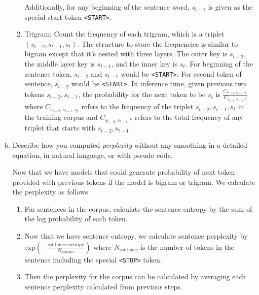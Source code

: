 \documentclass{article}
\newenvironment{solution}{\color{blue}}{}
\begin{document}
\begin{enumerate}[(a)]
\begin{solution}
\begin{enumerate}[1.]
      Additionally, for any beginning of the sentence word, $s_{t-1}$ is given as the special 
      start token \texttt{<START>}.
      \item Trigram: Count the frequency of each trigram, which is a triplet
      $(s_{t-2}, s_{t-1}, s_{t})$. The structure to store the frequencies is similar to 
      bigram except that it's nested with three layers. The outer key is $s_{t-2}$, the 
      middle layer key is $s_{t-1}$, and the inner key is $s_{t}$. For beginning of the 
      sentence token, $s_{t-2}$ and $s_{t-1}$ would be \texttt{<START>}. For second 
      token of sentence, $s_{t-2}$ would be \texttt{<START>}. In inference time, given 
      previous two tokens $s_{t-2}, s_{t-1}$, the probability for the next token to be 
      $s_{t}$ is $\frac{C_{s_{t-2}, s_{t-1}, s_{t}}}{C_{s_{t-2}, s_{t-1}, \ast}}$ where 
      $C_{s_{t-2}, s_{t-1}, s_{t}}$ refers to the frequency of the triplet $s_{t-2}, s_{t-1},
      s_{t}$ in the training corpus and $C_{s_{t-2}, s_{t-1}, \ast}$ refers to the total 
      frequency of any triplet that starts with $s_{t-2}, s_{t-1}$.
    \end{enumerate}
  \end{solution}
  
  \item Describe how you computed \textit{perplexity} without any smoothing in a detailed equation, in natural language, or with pseudo code.
  
  \begin{solution}
    Now that we have models that could generate probability of next token provided with previous 
    tokens if the model is bigram or trigram. We calculate the perplexity as follows
    \begin{enumerate}[1.]
      \item For sentences in the corpus, calculate the sentence entropy 
      by the sum of the log probability of each token.
      \item Now that we have sentence entropy, we calculate sentence perplexity by 
      $\text{exp}(-\frac{\text{sentence entropy}}{N_{\text{sentence}}})$ where 
      $N_{\text{sentence}}$ is the number of tokens in the sentence including 
      the special \texttt{<STOP>} token. 
      \item Then the perplexity for the corpus can be calculated by averaging each sentence 
      perplexity calculated from previous steps.
    \end{enumerate}
  \end{solution}
  

\end{enumerate}
\end{document}
